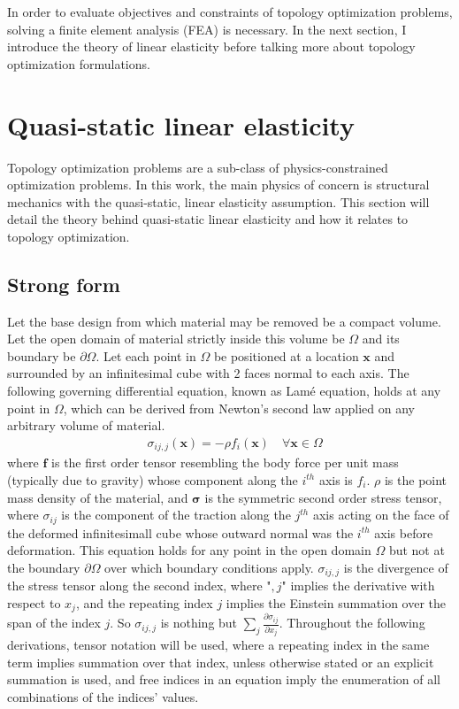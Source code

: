 In order to evaluate objectives and constraints of topology optimization problems, solving a finite element analysis (FEA) is necessary. In the next section, I introduce the theory of linear elasticity before talking more about topology optimization formulations.

\newpage
\section{Quasi-static linear elasticity}

    Topology optimization problems are a sub-class of physics-constrained optimization problems. In this work, the main physics of concern is structural mechanics with the quasi-static, linear elasticity assumption. This section will detail the theory behind quasi-static linear elasticity and how it relates to topology optimization.

\subsection{Strong form}

	Let the base design from which material may be removed be a compact volume. Let the open domain of material strictly inside this volume be $\Omega$ and its boundary be $\partial \Omega$. Let each point in $\Omega$ be positioned at a location $\bm{x}$ and surrounded by an infinitesimal cube with 2 faces normal to each axis. The following governing differential equation, known as Lam\'e equation, holds at any point in $\Omega$, which can be derived from Newton's second law applied on any arbitrary volume of material.
	\begin{align} \label{governing}
		& \sigma_{ij,j}(\bm{x}) = -\rho f_i(\bm{x}) \quad \forall \bm{x} \in \Omega
	\end{align}
	where $\bm{f}$ is the first order tensor resembling the body force per unit mass (typically due to gravity) whose component along the $i^{th}$ axis is $f_i$. $\rho$ is the point mass density of the material, and $\bm{\sigma}$ is the symmetric second order stress tensor, where $\sigma_{ij}$ is the component of the traction along the $j^{th}$ axis acting on the face of the deformed infinitesimall cube whose outward normal was the $i^{th}$ axis before deformation. This equation holds for any point in the open domain $\Omega$ but not at the boundary $\partial\Omega$ over which boundary conditions apply. $\sigma_{ij,j}$ is the divergence of the stress tensor along the second index, where "$,j$" implies the derivative with respect to $x_j$, and the repeating index $j$ implies the Einstein summation over the span of the index $j$. So $\sigma_{ij,j}$ is nothing but $\sum_{j} \frac{\partial \sigma_{ij}}{\partial x_j}$. Throughout the following derivations, tensor notation will be used, where a repeating index in the same term implies summation over that index, unless otherwise stated or an explicit summation is used, and free indices in an equation imply the enumeration of all combinations of the indices' values.


